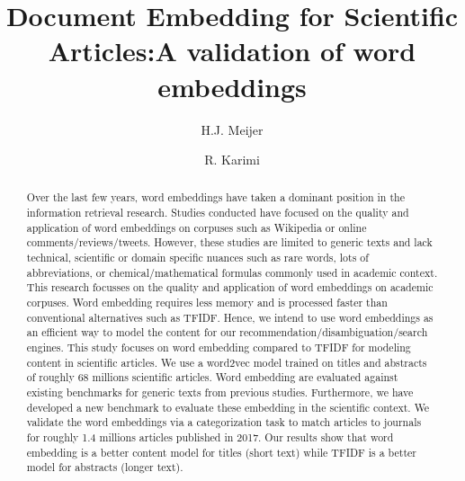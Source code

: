 \documentclass[runningheads]{llncs}
\begin{document}
\title{Document Embedding for Scientific Articles:\newline A validation of word embeddings}

\author{H.J. Meijer \and
R. Karimi}

\maketitle
\begin{abstract}
Over the last few years, word embeddings have taken a dominant position in the information retrieval research. Studies conducted have focused on the quality and application of word embeddings on corpuses such as Wikipedia or online comments/reviews/tweets. However, these studies are limited to generic texts and lack technical, scientific or domain specific nuances such as rare words, lots of abbreviations, or chemical/mathematical formulas commonly used in academic context. This research focusses on the quality and application of word embeddings on academic corpuses. Word embedding requires less memory and is processed faster than conventional alternatives such as TFIDF. Hence, we intend to use word embeddings as an efficient way to model the content for our recommendation/disambiguation/search engines. This study focuses on word embedding compared to TFIDF for modeling content in scientific articles. We use a word2vec model  trained on titles and abstracts of roughly 68 millions scientific articles. Word embedding are evaluated against existing benchmarks for generic texts from previous studies. Furthermore, we have developed a new benchmark to evaluate these embedding in the scientific context. We validate the word embeddings via a categorization task to match articles to journals for roughly 1.4 millions articles published in 2017. Our results show that word embedding is a better content model for titles (short text) while TFIDF is a better model for abstracts (longer text).
\end{abstract}
\end{document}

